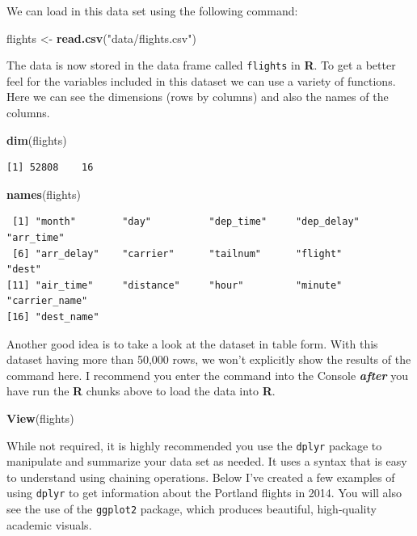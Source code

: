 \documentclass[twoside,12pt,final]{ucthesis-CA2012}
\newenvironment{Shaded}{}{}
\newcommand{\KeywordTok}[1]{\textcolor[rgb]{0.00,0.44,0.13}{\textbf{{#1}}}}
\newcommand{\StringTok}[1]{\textcolor[rgb]{0.25,0.44,0.63}{{#1}}}
\newcommand{\NormalTok}[1]{{#1}}
\begin{document}
\begin{ucmainmatter}
We can load in this data set using the following command:
\begin{Shaded}
\begin{Highlighting}[]
\NormalTok{flights <-}\StringTok{ }\KeywordTok{read.csv}\NormalTok{(}\StringTok{"data/flights.csv"}\NormalTok{)}
\end{Highlighting}
\end{Shaded}
The data is now stored in the data frame called \texttt{flights} in \textbf{R}. To get a better feel for the variables included in this dataset we can use a variety of functions. Here we can see the dimensions (rows by columns) and also the names of the columns.
\begin{Shaded}
\begin{Highlighting}[]
\KeywordTok{dim}\NormalTok{(flights)}
\end{Highlighting}
\end{Shaded}
\begin{verbatim}
[1] 52808    16
\end{verbatim}
\begin{Shaded}
\begin{Highlighting}[]
\KeywordTok{names}\NormalTok{(flights)}
\end{Highlighting}
\end{Shaded}
\begin{verbatim}
 [1] "month"        "day"          "dep_time"     "dep_delay"    "arr_time"    
 [6] "arr_delay"    "carrier"      "tailnum"      "flight"       "dest"        
[11] "air_time"     "distance"     "hour"         "minute"       "carrier_name"
[16] "dest_name"   
\end{verbatim}
Another good idea is to take a look at the dataset in table form. With this dataset having more than 50,000 rows, we won't explicitly show the results of the command here. I recommend you enter the command into the Console \textbf{\emph{after}} you have run the \textbf{R} chunks above to load the data into \textbf{R}.
\begin{Shaded}
\begin{Highlighting}[]
\KeywordTok{View}\NormalTok{(flights)}
\end{Highlighting}
\end{Shaded}
While not required, it is highly recommended you use the \texttt{dplyr} package to manipulate and summarize your data set as needed. It uses a syntax that is easy to understand using chaining operations. Below I've created a few examples of using \texttt{dplyr} to get information about the Portland flights in 2014. You will also see the use of the \texttt{ggplot2} package, which produces beautiful, high-quality academic visuals.


\end{ucmainmatter}
\end{document}
